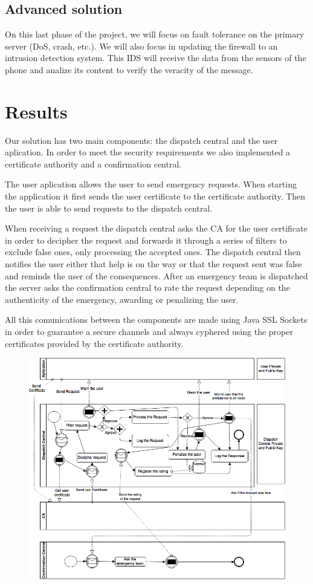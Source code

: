 \documentclass[a4paper,titlepage,11pt]{article}
\begin{document}
\subsection{Advanced solution}
On this last phase of the project, we will focus on fault tolerance on the primary server (DoS, crash, etc.).
We will also focus in updating the firewall to an intrusion detection system. This IDS will receive the data
from the sensors of the phone and analize its content to verify the veracity of the message.


\section{Results}
Our solution has two main components: the dispatch central and the user aplication.
In order to meet the security requirements we also implemented a certificate authority and a confirmation central.

The user aplication allows the user to send emergency requests. When starting the application it first sends
the user certificate to the certificate authority. Then the user is able to send requests to the dispatch central.

When receiving a request the dispatch central asks the CA for the user certificate in order to decipher the request and
forwards it through a series of filters to exclude false ones, only processing the accepted ones. The dispatch central then
notifies the user either that help is on the way or that the request sent was false and reminds the user of the consequences.
After an emergency team is dispatched the server asks the confirmation central to rate the request depending on the
authenticity of the emergency, awarding or penalizing the user.

All this comunications between the components are made using Java SSL Sockets in order to guarantee a secure channels and
always cyphered using the proper certificates provided by the certificate authority.

\begin{figure}[ht]
    \centering
    \includegraphics[scale=0.45]{img/advanced-solution.png}
\end{figure}
\end{document}
